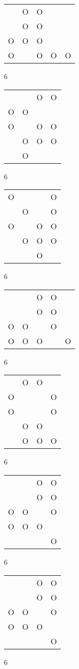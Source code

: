 \begin{tabular}{|m{0.2cm}m{0.2cm}m{0.2cm}m{0.2cm}m{0.2cm}|}\hline
 &O&O& & \\
 &O&O& & \\
O&O&O& & \\
O& &O&O&O\\
\hline\end{tabular}6
\begin{tabular}{|m{0.2cm}m{0.2cm}m{0.2cm}m{0.2cm}|}\hline
 & &O&O\\
O&O& & \\
O& &O&O\\
 &O&O&O\\
 &O& & \\
\hline\end{tabular}6
\begin{tabular}{|m{0.2cm}m{0.2cm}m{0.2cm}m{0.2cm}|}\hline
O& & &O\\
 &O& &O\\
O& &O&O\\
 &O&O&O\\
 & &O& \\
\hline\end{tabular}6
\begin{tabular}{|m{0.2cm}m{0.2cm}m{0.2cm}m{0.2cm}m{0.2cm}|}\hline
 & &O&O& \\
 & &O&O& \\
O&O& &O& \\
O&O&O& &O\\
\hline\end{tabular}6
\begin{tabular}{|m{0.2cm}m{0.2cm}m{0.2cm}m{0.2cm}|}\hline
 &O&O& \\
O& & &O\\
O& & &O\\
 &O&O& \\
 &O&O&O\\
\hline\end{tabular}6
\begin{tabular}{|m{0.2cm}m{0.2cm}m{0.2cm}m{0.2cm}|}\hline
 & &O&O\\
 & &O&O\\
O&O& &O\\
O&O&O& \\
 & & &O\\
\hline\end{tabular}6
\begin{tabular}{|m{0.2cm}m{0.2cm}m{0.2cm}m{0.2cm}|}\hline
 & &O&O\\
 & &O&O\\
O&O& &O\\
O&O&O& \\
 & & &O\\
\hline\end{tabular}6
